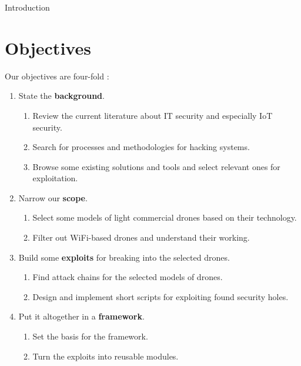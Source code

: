 \begin{chaptercover}{Introduction}
\section{Objectives}
Our objectives are four-fold :
\begin{enumerate}[itemsep=0.2cm,topsep=0.1cm]
  \item State the \textbf{background}.
  \begin{enumerate}[label=\Alph* --,align=left,itemsep=.1cm]
    \item Review the current literature about IT security and especially IoT security.
    \item Search for processes and methodologies for hacking systems.
    \item Browse some existing solutions and tools and select relevant ones for exploitation.
  \end{enumerate}
  \item Narrow our \textbf{scope}.
  \begin{enumerate}[label=\Alph* --,align=left,itemsep=.1cm]
    \item Select some models of light commercial drones based on their technology.
    \item Filter out WiFi-based drones and understand their working.
  \end{enumerate}
  \item Build some \textbf{exploits} for breaking into the selected drones.
  \begin{enumerate}[label=\Alph* --,align=left,itemsep=.1cm]
    \item Find attack chains for the selected models of drones.
    \item Design and implement short scripts for exploiting found security holes.
  \end{enumerate}
  \item Put it altogether in a \textbf{framework}.
  \begin{enumerate}[label=\Alph* --,align=left,itemsep=.1cm]
    \item Set the basis for the framework.
    \item Turn the exploits into reusable modules.
  \end{enumerate}
\end{enumerate}


\end{chaptercover}
